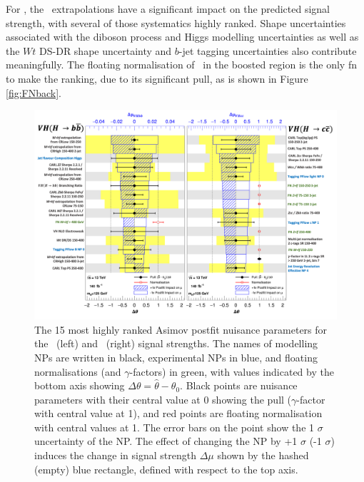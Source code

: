 For \vhb, the \whf\ extrapolations have a significant impact on the predicted signal strength, with several of those systematics highly ranked. Shape uncertainties associated with the diboson process and Higgs modelling uncertainties as well as the $Wt$ DS-DR shape uncertainty and $b$-jet tagging uncertainties also contribute meaningfully. The floating normalisation of \whf\ in the boosted region is the only \gls{fn} to make the ranking, due to its significant pull, as is shown in Figure \ref{fig:FNback}.

\begin{figure}[h!]
    \centering
    \includegraphics[width=\textwidth]{Images/VH/Fit/fromSlides/ranking.png}
    \caption{The 15 most highly ranked Asimov postfit nuisance parameters for the \vhb\ (left) and \vhc\ (right) signal strengths. The names of modelling NPs are written in black, experimental NPs in blue, and floating normalisations (and $\gamma$-factors) in green, with values indicated by the bottom axis showing $\Delta \theta = \hat{\theta} - \theta_0$. Black points are nuisance parameters with their central value at 0 showing the pull ($\gamma$-factor with central value at 1), and red points are floating normalisation with central values at 1. The error bars on the point show the 1 $\sigma$ uncertainty of the NP. The effect of changing the NP by +1 $\sigma$ (-1 $\sigma$) induces the change in signal strength $\Delta\mu$ shown by the hashed (empty) blue rectangle, defined with respect to the top axis.}
    \label{fig:rankingPostfit}
\end{figure}

